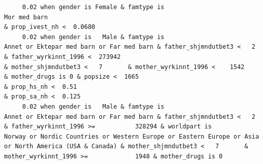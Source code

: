 \documentclass[
  letterpaper,
  DIV=11,
  numbers=noendperiod]{scrreprt}
\begin{document}
\begin{verbatim}
     0.02 when gender is Female & famtype is                                                     Mor med barn                                                                                                                                                                                                                                                                                                                                                                                                                                                                                               & prop_ivest_nh <  0.0680                                                                                                                                                                                                                                                  
     0.02 when gender is   Male & famtype is                        Annet or Ektepar med barn or Far med barn & father_shjmndutbet3 <   2       & father_wyrkinnt_1996 <  273942                                                                                                                                                              & mother_shjmndutbet3 <   7       & mother_wyrkinnt_1996 <    1542           & mother_drugs is 0 & popsize <  1665                                                                            & prop_hs_nh <  0.51                                                                                                                                                   & prop_sa_nh <  0.125                                                                                                                                               
     0.02 when gender is   Male & famtype is                        Annet or Ektepar med barn or Far med barn & father_shjmndutbet3 <   2       & father_wyrkinnt_1996 >=           328294 & worldpart is                              Norway or Nordic Countries or Western Europe or Eastern Europe or Asia or North America (USA & Canada) & mother_shjmndutbet3 <   7       & mother_wyrkinnt_1996 >=             1948 & mother_drugs is 0                                                                                                                                                                                                                                                                                                                                                                                                                                         

\end{verbatim}
\end{document}
